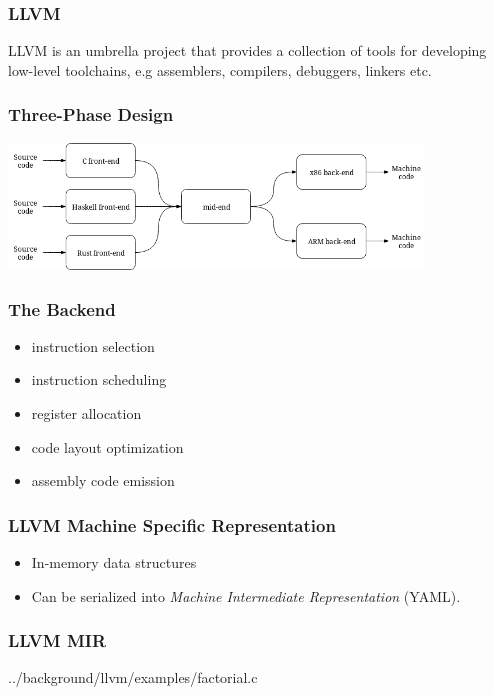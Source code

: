 \begin{frame}
	\frametitle{LLVM}
	LLVM is an umbrella project that provides a collection of tools for developing low-level
	toolchains, e.g assemblers, compilers, debuggers, linkers etc. 
\end{frame}

\begin{frame}
	\frametitle{Three-Phase Design}
	\includegraphics[width=11cm]{../background/llvm/figures/three_phase_compiler}
\end{frame}

\begin{frame}
	\frametitle{The Backend}

	\begin{itemize}
		\item instruction selection
		\item instruction scheduling
		\item register allocation
		\item code layout optimization
		\item assembly code emission
	\end{itemize}

\end{frame}

\begin{frame}
	\frametitle{LLVM Machine Specific Representation}

	\begin{itemize}
		\item	In-memory data structures
		\item	Can be serialized into \textit{Machine Intermediate Representation} (YAML).
	\end{itemize}

\end{frame}

\begin{frame}
	\frametitle{LLVM MIR}

	
	{../background/llvm/examples/factorial.c}

\end{frame}


